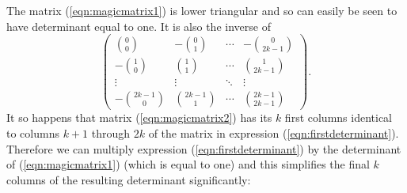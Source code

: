 \documentclass[12pt,letterpaper]{amsart}
\theoremstyle{plain}
\theoremstyle{definition}
\theoremstyle{remark}
\numberwithin{equation}{subsection}
\numberwithin{theorem}{subsection}
\numberwithin{table}{subsection}
\begin{document}
The matrix (\ref{eqn:magicmatrix1}) is lower triangular and so can
easily be seen to have determinant equal to one.  It is also the
inverse of
 \begin{equation}
\left(\begin{array}{cccccccccccc} \binom{0}{0} & -\binom{0}{1} &
\cdots & -\binom{0}{2k-1}
\\-\binom{1}{0} & \binom{1}{1} & \cdots & \binom{1}{2k-1} \\
\vdots & \vdots & \ddots & \vdots
\\ -\binom{2k-1}{0} & \binom{2k-1}{1} & \cdots &
\binom{2k-1}{2k-1} \end{array}\right).\label{eqn:magicmatrix2}
\end{equation}
It so happens that matrix (\ref{eqn:magicmatrix2}) has its $k$
first columns identical to columns $k+1$ through $2k$ of the
matrix in expression (\ref{eqn:firstdeterminant}).  Therefore we
can multiply expression (\ref{eqn:firstdeterminant}) by the
determinant of (\ref{eqn:magicmatrix1}) (which is equal to one)
and this simplifies the final $k$ columns of the resulting
determinant significantly:
\end{document}
